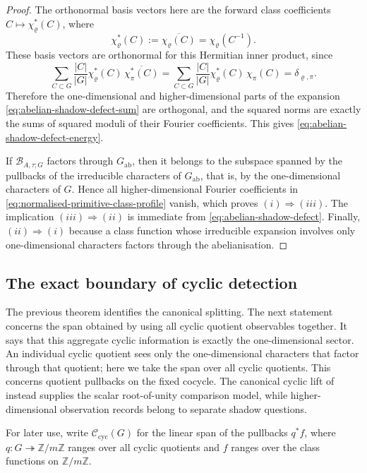 \documentclass[11pt,a4paper]{amsart}
\theoremstyle{plain}
\theoremstyle{definition}
\theoremstyle{remark}
\newcommand{\ZZ}{\mathbb{Z}}
\begin{document}
\begin{proof}
  The orthonormal basis vectors here are the forward class coefficients
  \(C\mapsto \chi_\varrho^\ast(C)\), where
  \[
    \chi_\varrho^\ast(C):=\overline{\chi_\varrho(C)}
    =\chi_\varrho(C^{-1}).
  \]
  These basis vectors are orthonormal for this Hermitian inner product,
  since
  \[
    \sum_{C\subset G}\frac{|C|}{|G|}
      \chi_\varrho^\ast(C)\,\overline{\chi_\pi^\ast(C)}
    =
    \sum_{C\subset G}\frac{|C|}{|G|}
      \chi_\varrho^\ast(C)\,\chi_\pi(C)
    =
    \delta_{\varrho,\pi}.
  \]
  Therefore the one-dimensional and higher-dimensional parts of the
  expansion \eqref{eq:abelian-shadow-defect-sum} are orthogonal, and
  the squared norms are exactly the sums of squared moduli of their
  Fourier coefficients. This gives
  \eqref{eq:abelian-shadow-defect-energy}.

  If \(\mathcal B_{A,\tau;G}\) factors through \(G_{\mathrm{ab}}\), then it
  belongs to the subspace spanned by the pullbacks of the irreducible
  characters of \(G_{\mathrm{ab}}\), that is, by the one-dimensional
  characters of \(G\). Hence all higher-dimensional Fourier coefficients
  in \eqref{eq:normalised-primitive-class-profile} vanish, which proves
  \((i)\Rightarrow(iii)\). The implication \((iii)\Rightarrow(ii)\) is
  immediate from \eqref{eq:abelian-shadow-defect}. Finally,
  \((ii)\Rightarrow(i)\) because a class function whose irreducible
  expansion involves only one-dimensional characters factors through the
  abelianisation.
\end{proof}

\subsection{The exact boundary of cyclic detection}

The previous theorem identifies the canonical splitting. The next
statement concerns the span obtained by using all cyclic quotient
observables together. It says that this aggregate cyclic information is
exactly the one-dimensional sector. An individual cyclic quotient sees
only the one-dimensional characters that factor through that quotient;
here we take the span over all cyclic quotients. This concerns quotient
pullbacks on the fixed cocycle.  The canonical cyclic lift of
 instead supplies the scalar root-of-unity comparison
model, while higher-dimensional observation records belong to separate shadow
questions.

For later use, write \(\mathscr C_{\mathrm{cyc}}(G)\) for the linear
span of the pullbacks \(q^\ast f\), where \(q:G\twoheadrightarrow \ZZ/m\ZZ\)
ranges over all cyclic quotients and \(f\) ranges over the class
functions on \(\ZZ/m\ZZ\).
\end{document}
